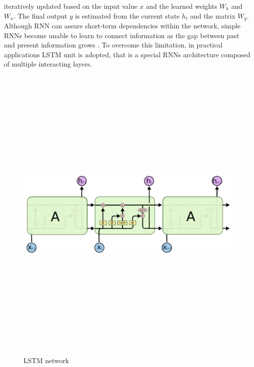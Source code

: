 iteratively updated based on the input value $x$ and the learned weights $W_h$  
and $W_x$. The final output $y$  is estimated from the current state $h_t$  
and the matrix $W_y$. Although RNN can assure short-term dependencies within 
the network, simple RNNs become unable to learn to connect information as the 
gap between past and present information grows \cite{lstm}. To overcome this 
limitation, in practical applications LSTM unit is adopted, that is a special 
RNNs architecture composed of multiple interacting layers.
\begin{figure}[H]
    \centering
    \includegraphics[width=15cm,height=15cm,keepaspectratio]{Background/rnn3.png}
    \caption{LSTM network}
    \label{rnn3}
\end{figure} 

